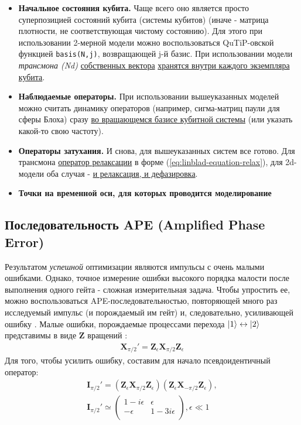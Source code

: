 \documentclass[12pt, twoside]{report}
\DeclarePairedDelimiter\ket{\lvert}{\rangle}
\numberwithin{equation}{section}
\numberwithin{figure}{section}
\begin{document}
\begin{itemize}
\begin{itemize}
	\end{itemize}
	\item \textbf{Начальное состояния кубита.} Чаще всего оно является просто суперпозицией состояний кубита (системы кубитов) (иначе - матрица плотности, не соответствующая чистому состоянию). Для этого при использовании 2-мерной модели можно воспользоваться QuTiP-овской функцией \texttt{basis(N,j)}, возвращающей j-й базис. При использовании модели \textit{трансмона (Nd)} \underline{собственных вектора} \underline{хранятся внутри каждого экземпляра кубита}.
	\item \textbf{Наблюдаемые операторы.} При использовании вышеуказанных моделей можно считать динамику операторов (например, сигма-матриц паули для сферы Блоха) сразу \underline{во вращающемся базисе кубитной системы} (или указать какой-то свою частоту).
	\item \textbf{Операторы затухания.} И снова, для вышеуказанных систем все готово. Для трансмона \underline{оператор релаксации} в форме (\ref{eq:linblad-equation-relax}), для 2d-модели оба случая - \underline{и релаксация, и дефазировка}.
	\item \textbf{Точки на временной оси, для которых проводится моделирование}
\end{itemize} 

\subsection{Последовательность APE (Amplified Phase Error)}

Результатом \textit{успешной} оптимизации являются импульсы с очень малыми ошибками. Однако, точное измерение ошибки высокого порядка малости после выполнения одного гейта - сложная измерительная задача. Чтобы упростить ее, можно воспользоваться APE-последовательностью, повторяющей много раз исследуемый импульс (и порождаемый им гейт) и, следовательно, усиливающей ошибку \cite{Lucero2010}. Малые ошибки, порождаемые процессами перехода $\ket{1} \leftrightarrow \ket{2}$ представимы в виде $\mathbf{Z}$ вращений  \cite{Steffen2006}:
\begin{gather*}
\mathbf{X}_{\pi/2}' = \mathbf{Z}_\epsilon \mathbf{X}_{\pi/2} \mathbf{Z}_\epsilon
\end{gather*}
Для того, чтобы усилить ошибку, составим для начало псевдоидентичный оператор:
\begin{gather*}
\mathbf{I}_{\pi/2}' = \left( \mathbf{Z}_\epsilon \mathbf{X}_{\pi/2} \mathbf{Z}_\epsilon \right) \left( \mathbf{Z}_\epsilon \mathbf{X}_{-\pi/2} \mathbf{Z}_\epsilon \right),\\
\mathbf{I}_{\pi/2}' \simeq 
\begin{pmatrix}
1 - i\epsilon & \epsilon \\
-\epsilon & 1 -3i\epsilon \\
\end{pmatrix}, \epsilon \ll 1
\end{gather*}
\end{document}
